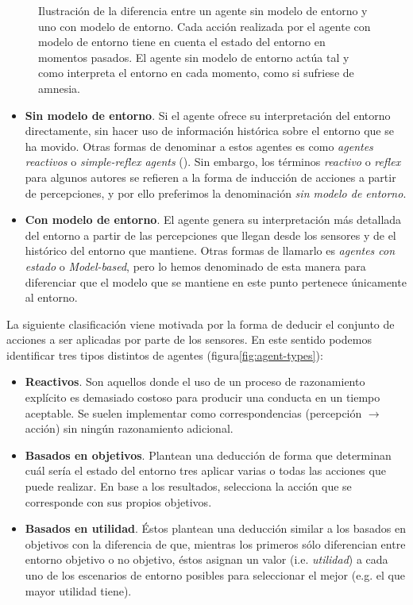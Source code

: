 \begin{figure}[t]
	\caption[Diferencias entre un agente sin y con modelo de entorno.]{Ilustración de la diferencia entre un agente sin modelo de entorno y uno con modelo de entorno. Cada acción realizada por el agente con modelo de entorno tiene en cuenta el estado del entorno en momentos pasados. El agente sin modelo de entorno actúa tal y como interpreta el entorno en cada momento, como si sufriese de amnesia.}
	\label{fig:memory-vs-amnesia-in-agents}
\end{figure}

\begin{itemize}
	\item \textbf{Sin modelo de entorno}. Si el agente ofrece su interpretación del entorno directamente, sin hacer uso de información histórica sobre el entorno que se ha movido. Otras formas de denominar a estos agentes es como \textit{agentes reactivos} o \textit{simple-reflex agents} (\cite{russell2003artificial}). Sin embargo, los términos \textit{reactivo} o \textit{reflex} para algunos autores se refieren a la forma de inducción de acciones a partir de percepciones, y por ello preferimos la denominación \textit{sin modelo de entorno}.
	\item \textbf{Con modelo de entorno}. El agente genera su interpretación más detallada del entorno a partir de las percepciones que llegan desde los sensores y de el histórico del entorno que mantiene. Otras formas de llamarlo es \textit{agentes con estado} o \textit{Model-based}, pero lo hemos denominado de esta manera para diferenciar que el modelo que se mantiene en este punto pertenece únicamente al entorno.
\end{itemize}

La siguiente clasificación viene motivada por la forma de deducir el conjunto de acciones a ser aplicadas por parte de los sensores. En este sentido podemos identificar tres tipos distintos de agentes (figura\ref{fig:agent-types}):

\begin{itemize}
	\item \textbf{Reactivos}. Son aquellos donde el uso de un proceso de razonamiento explícito es demasiado costoso para producir una conducta en un tiempo aceptable. Se suelen implementar como correspondencias (percepción $\rightarrow$ acción) sin ningún razonamiento adicional.
	\item \textbf{Basados en objetivos}. Plantean una deducción de forma que determinan cuál sería el estado del entorno tres aplicar varias o todas las acciones que puede realizar. En base a los resultados, selecciona la acción que se corresponde con sus propios objetivos.
	\item \textbf{Basados en utilidad}. Éstos plantean una deducción similar a los basados en objetivos con la diferencia de que, mientras los primeros sólo diferencian entre entorno objetivo o no objetivo, éstos asignan un valor (i.e. \textit{utilidad}) a cada uno de los escenarios de entorno posibles para seleccionar el mejor (e.g. el que mayor utilidad tiene).
\end{itemize}

